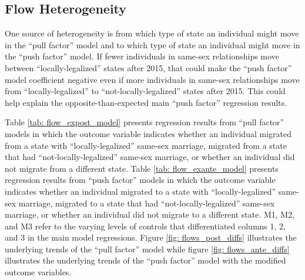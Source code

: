 \documentclass[12pt,letterpaper]{article}
\begin{document}
\begin{table}[h]
    \centering
    
    \caption{}
    \label{tab: expost_model}
\end{table}
\begin{table}[h]
    \centering
    
    \caption{}
    \label{tab: exante_model}
\end{table}

\clearpage
\subsection{Flow Heterogeneity}

One source of heterogeneity is from which type of state an individual might move in the “pull factor” model and to which type of state an individual might move in the “push factor” model. If fewer individuals in same-sex relationships move between “locally-legalized” states after 2015, that could make the “push factor” model coefficient negative even if more individuals in same-sex relationships move from “locally-legalized” to “not-locally-legalized” states after 2015. This could help explain the opposite-than-expected main “push factor” regression results.

Table \ref{tab: flow_expost_model} presents regression results from “pull factor” models in which the outcome variable indicates whether an individual migrated from a state with “locally-legalized” same-sex marriage, migrated from a state that had “not-locally-legalized” same-sex marriage, or whether an individual did not migrate from a different state. Table \ref{tab: flow_exante_model} presents regression results from “push factor” models in which the outcome variable indicates whether an individual migrated to a state with “locally-legalized” same-sex marriage, migrated to a state that had “not-locally-legalized” same-sex marriage, or whether an individual did not migrate to a different state. M1, M2, and M3 refer to the varying levels of controls that differentiated columns 1, 2, and 3 in the main model regressions.  Figure \ref{fig: flows_post_diffs} illustrates the underlying trends of the “pull factor” model while figure \ref{fig: flows_ante_diffs} illustrates the underlying trends of the “push factor” model with the modified outcome variables.
\end{document}
